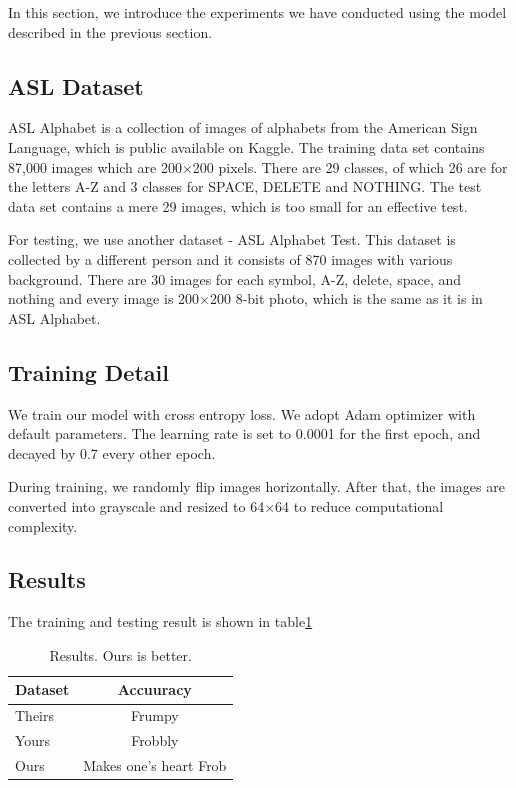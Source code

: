 \documentclass[10pt,twocolumn,letterpaper]{article}
\begin{document}
In this section, we introduce the experiments we have conducted using the model described in the previous section.

\subsection{ASL Dataset}

ASL Alphabet\cite{noauthor_asl_nodate} is a collection of images of alphabets from the American Sign Language, which is public available on Kaggle. The training data set contains 87,000 images which are 200$\times$200 pixels. There are 29 classes, of which 26 are for the letters A-Z and 3 classes for SPACE, DELETE and NOTHING. The test data set contains a mere 29 images, which is too small for an effective test.

For testing, we use another dataset - ASL Alphabet Test\cite{noauthor_asl_nodate-1}. This dataset is collected by a different person and it consists of 870 images with various background. There are 30 images for each symbol, A-Z, delete, space, and nothing and every image is 200$\times$200 8-bit photo, which is the same as it is in ASL Alphabet. 

\subsection{Training Detail}

We train our model with cross entropy loss. We adopt Adam optimizer\cite{kingma2014adam} with default parameters. The learning rate is set to 0.0001 for the first epoch, and decayed by 0.7 every other epoch. 

During training, we randomly flip images horizontally. After that, the images are converted into grayscale and resized to 64$\times$64 to reduce computational complexity. 

\subsection{Results}

The training and testing result is shown in table\ref{table:result}

\begin{table}[h]
\begin{center}
\begin{tabular}{|l|c|}
\hline
Dataset & Accuuracy \\
\hline\hline
Theirs & Frumpy \\
Yours & Frobbly \\
Ours & Makes one's heart Frob\\
\hline
\end{tabular}
\end{center}
\caption{Results.   Ours is better.}
\label{table:result}
\end{table}
\end{document}
